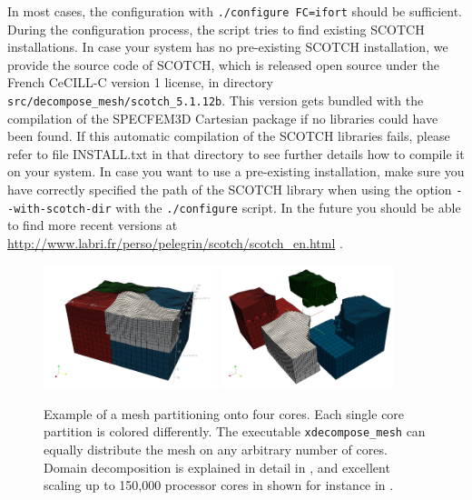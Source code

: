 In most cases, the configuration with \texttt{./configure~FC=ifort}
should be sufficient. During the configuration process, the script
tries to find existing SCOTCH installations. In case your system has
no pre-existing SCOTCH installation, we provide the source code of
SCOTCH, which is released open source under the French CeCILL-C version
1 license, in directory \texttt{src/decompose\_mesh/scotch\_5.1.12b}.
This version gets bundled with the compilation of the SPECFEM3D Cartesian
package if no libraries could have been found. If this automatic compilation
of the SCOTCH libraries fails, please refer to file INSTALL.txt in
that directory to see further details how to compile it on your system.
In case you want to use a pre-existing installation, make sure you
have correctly specified the path of the SCOTCH library when using
the option \texttt{-{}-with-scotch-dir} with the \texttt{./configure}
script. In the future you should be able to find more recent versions
at \url{http://www.labri.fr/perso/pelegrin/scotch/scotch_en.html}
. \\


\begin{figure}[htbp]
\noindent \begin{centering}
\includegraphics[width=0.45\textwidth]{figures/mount-partitions.jpg}
\includegraphics[width=0.45\textwidth]{figures/mount-partitions2.jpg}
\par\end{centering}

\caption{Example of a mesh partitioning onto four cores. Each single core partition
is colored differently. The executable \texttt{xdecompose\_mesh} can
equally distribute the mesh on any arbitrary number of cores. Domain
decomposition is explained in detail in \citet{MaKoBlLe08}, and excellent
scaling up to 150,000 processor cores in shown for instance in \citet{CaKoLaTiMiLeSnTr08,KoLaMi08a,MaKoBlLe08,KoErGoMi10,Kom11}.}


\label{fig:mount.partitions}
\end{figure}


